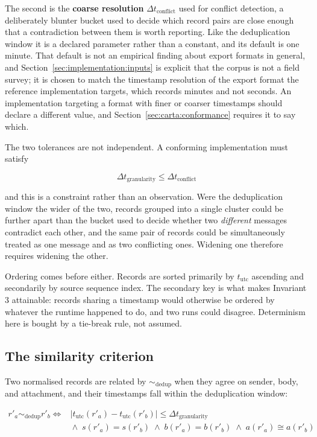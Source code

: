 The second is the \textbf{coarse resolution} $\Delta t_{\text{conflict}}$ used
for conflict detection, a deliberately blunter bucket used to decide which record
pairs are close enough that a contradiction between them is worth reporting. Like
the deduplication window it is a declared parameter rather than a constant, and
its default is one minute. That default is not an empirical finding about export
formats in general, and Section~\ref{sec:implementation:inputs} is explicit that
the corpus is not a field survey; it is chosen to match the timestamp resolution
of the export format the reference implementation targets, which records minutes
and not seconds. An implementation targeting a format with finer or coarser
timestamps should declare a different value, and
Section~\ref{sec:carta:conformance} requires it to say which.

The two tolerances are not independent. A conforming implementation must satisfy

\begin{equation}
  \Delta t_{\text{granularity}} \le \Delta t_{\text{conflict}}
  \label{eq:tolerances}
\end{equation}

and this is a constraint rather than an observation. Were the deduplication
window the wider of the two, records grouped into a single cluster could be
further apart than the bucket used to decide whether two \emph{different}
messages contradict each other, and the same pair of records could be
simultaneously treated as one message and as two conflicting ones. Widening one
therefore requires widening the other.

Ordering comes before either. Records are sorted primarily by $t_{\text{utc}}$
ascending and secondarily by source sequence index. The secondary key is what
makes Invariant 3 attainable: records sharing a timestamp would otherwise be
ordered by whatever the runtime happened to do, and two runs could disagree.
Determinism here is bought by a tie-break rule, not assumed.

\subsection{The similarity criterion}
\label{sec:algorithms:similarity}

Two normalised records are related by $\sim_{\text{dedup}}$ when they agree on
sender, body, and attachment, and their timestamps fall within the deduplication
window:

\begin{equation}
  \begin{split}
    r'_a \sim_{\text{dedup}} r'_b \iff{}
      &|t_{\text{utc}}(r'_a) - t_{\text{utc}}(r'_b)|
        \le \Delta t_{\text{granularity}} \\
      &{}\land\; s(r'_a) = s(r'_b)
       \;\land\; b(r'_a) = b(r'_b)
       \;\land\; a(r'_a) \cong a(r'_b)
  \end{split}
  \label{eq:dedup}
\end{equation}

